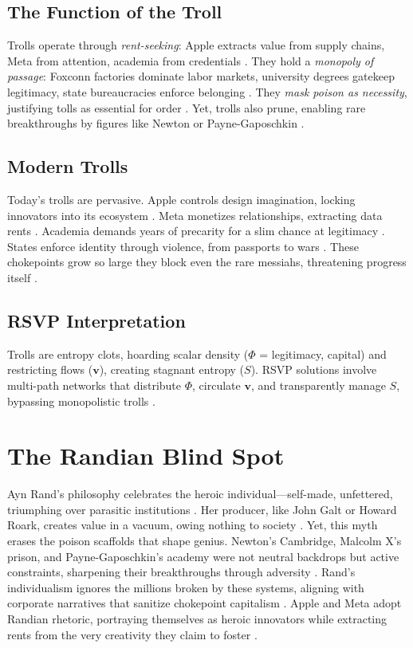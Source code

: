 \documentclass[12pt]{article}
\begin{document}
\subsection{The Function of the Troll}
Trolls operate through \textit{rent-seeking}: Apple extracts value from supply chains, Meta from attention, academia from credentials \citep{he2024apple, zuboff2019age}. They hold a \textit{monopoly of passage}: Foxconn factories dominate labor markets, university degrees gatekeep legitimacy, state bureaucracies enforce belonging \citep{graeber2018bullshit}. They \textit{mask poison as necessity}, justifying tolls as essential for order \citep{applebaum2020twilight}. Yet, trolls also prune, enabling rare breakthroughs by figures like Newton or Payne-Gaposchkin \citep{mirowski2011science}.

\subsection{Modern Trolls}
Today’s trolls are pervasive. Apple controls design imagination, locking innovators into its ecosystem \citep{he2024apple}. Meta monetizes relationships, extracting data rents \citep{zuboff2019age}. Academia demands years of precarity for a slim chance at legitimacy \citep{mirowski2011science}. States enforce identity through violence, from passports to wars \citep{giblin2022chokepoint}. These chokepoints grow so large they block even the rare messiahs, threatening progress itself \citep{doctorow2023internet}.

\subsection{RSVP Interpretation}
Trolls are entropy clots, hoarding scalar density ($\Phi$ = legitimacy, capital) and restricting flows ($\mathbf{v}$), creating stagnant entropy ($S$). RSVP solutions involve multi-path networks that distribute $\Phi$, circulate $\mathbf{v}$, and transparently manage $S$, bypassing monopolistic trolls \citep{doctorow2023internet}.

\section{The Randian Blind Spot}
Ayn Rand’s philosophy celebrates the heroic individual—self-made, unfettered, triumphing over parasitic institutions \citep{rand1957atlas, rand1943fountainhead}. Her producer, like John Galt or Howard Roark, creates value in a vacuum, owing nothing to society \citep{burns2009goddess}. Yet, this myth erases the poison scaffolds that shape genius. Newton’s Cambridge, Malcolm X’s prison, and Payne-Gaposchkin’s academy were not neutral backdrops but active constraints, sharpening their breakthroughs through adversity \citep{weil1958oppression}. Rand’s individualism ignores the millions broken by these systems, aligning with corporate narratives that sanitize chokepoint capitalism \citep{giblin2022chokepoint, zuboff2019age}. Apple and Meta adopt Randian rhetoric, portraying themselves as heroic innovators while extracting rents from the very creativity they claim to foster \citep{he2024apple, doctorow2023internet}.
\end{document}
